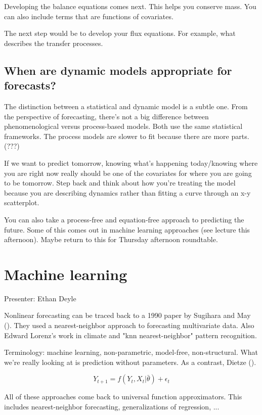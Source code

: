 \documentclass[12pt, oneside]{article}   	%
\begin{document}
Developing the balance equations comes next. This helps you conserve mass. You can also include terms that are functions of covariates.

The next step would be to develop your flux equations. For example, what describes the transfer processes.

\subsection{When are dynamic models appropriate for forecasts?}

The distinction between a statistical and dynamic model is a subtle one. From the perspective of forecasting, there's not a big difference between phenomenological versus process-based models. Both use the same statistical frameworks. The process models are slower to fit because there are more parts. (???)

If we want to predict tomorrow, knowing what's happening today/knowing where you are right now really should be one of the covariates for where you are going to be tomorrow. Step back and think about how you're treating the model because you are describing dynamics rather than fitting a curve through an x-y scatterplot.

You can also take a process-free and equation-free approach to predicting the future. Some of this comes out in machine learning approaches (see lecture this afternoon). Maybe return to this for Thursday afternoon roundtable. 

\section{Machine learning}

Presenter: Ethan Deyle

Nonlinear forecasting can be traced back to a 1990 paper by Sugihara and May (\cite{sugihara1990}). They used a nearest-neighbor approach to forecasting multivariate data. Also Edward Lorenz's work in climate and "knn nearest-neighbor" pattern recognition.

Terminology: machine learning, non-parametric, model-free, non-structural. What we're really looking at is prediction without parameters. As a contrast, Dietze (\cite{dietze2017a}).

$$Y_{t+1} = f(Y_t, X_t | \bar{\theta} ) + \epsilon_t$$

All of these approaches come back to universal function approximators. This includes nearest-neighbor forecasting, generalizations of regression, ...
\end{document}
